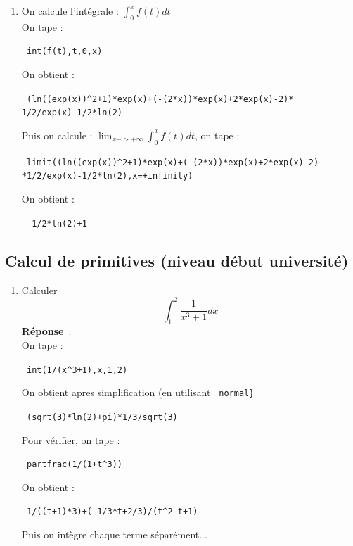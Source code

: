 \documentclass{article}
\begin{document}
\begin{giacjshere}
\begin{enumerate}
\item 
On calcule l'int\'egrale : $\displaystyle \int_0^x f(t)dt $\\
On tape :
\begin{center}
\verb| int(f(t),t,0,x)|
\end{center}
On obtient :
\begin{center}\verb| (ln((exp(x))^2+1)*exp(x)+(-(2*x))*exp(x)+2*exp(x)-2)*|
\verb| 1/2/exp(x)-1/2*ln(2)|\end{center}
Puis on calcule : $\displaystyle \lim_{x->+\infty}\int_0^x f(t)dt $, on tape :
\begin{center}
\verb| limit((ln((exp(x))^2+1)*exp(x)+(-(2*x))*exp(x)+2*exp(x)-2)|
\verb|*1/2/exp(x)-1/2*ln(2),x=+infinity)|
\end{center}
On obtient :
\begin{center}
\verb| -1/2*ln(2)+1|
\end{center}
\end{enumerate}

\subsection{Calcul de primitives (niveau d\'ebut universit\'e)}
\begin{enumerate}
\item Calculer $$\int_1^2\frac{1}{x^3+1}dx$$
{\bf R\'eponse}~:\\
On tape :
\begin{center}
\verb| int(1/(x^3+1),x,1,2)|
\end{center}
On obtient apres simplification (en utilisant \verb| normal} |
\begin{center}
 \verb| (sqrt(3)*ln(2)+pi)*1/3/sqrt(3)|
\end{center}
Pour v\'erifier, on tape :
\begin{center}
\verb| partfrac(1/(1+t^3))|
\end{center}
On obtient :
\begin{center}
\verb| 1/((t+1)*3)+(-1/3*t+2/3)/(t^2-t+1)|
\end{center}
Puis on int\`egre chaque terme s\'epar\'ement...


\end{enumerate}
\end{giacjshere}
\end{document}
